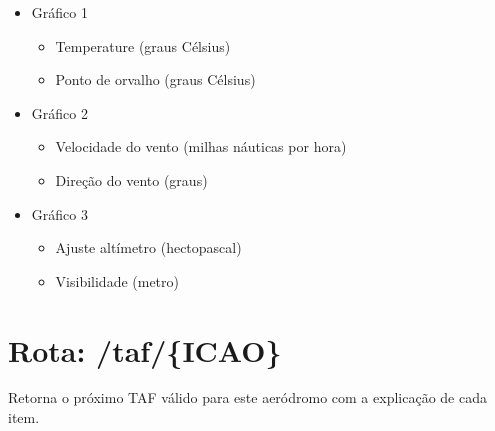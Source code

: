 \begin{itemize}
    \item Gráfico 1
    \begin{itemize}
        \item Temperature (graus Célsius)
        \item Ponto de orvalho (graus Célsius)
    \end{itemize}
    \item Gráfico 2
    \begin{itemize}
        \item Velocidade do vento (milhas náuticas por hora)
        \item Direção do vento (graus)
    \end{itemize}
    \item Gráfico 3
    \begin{itemize}
        \item Ajuste altímetro (hectopascal)
        \item Visibilidade (metro)
    \end{itemize}
\end{itemize}

\section{Rota: /taf/\{ICAO\}}
Retorna o próximo TAF válido para este aeródromo com a explicação de cada item.


